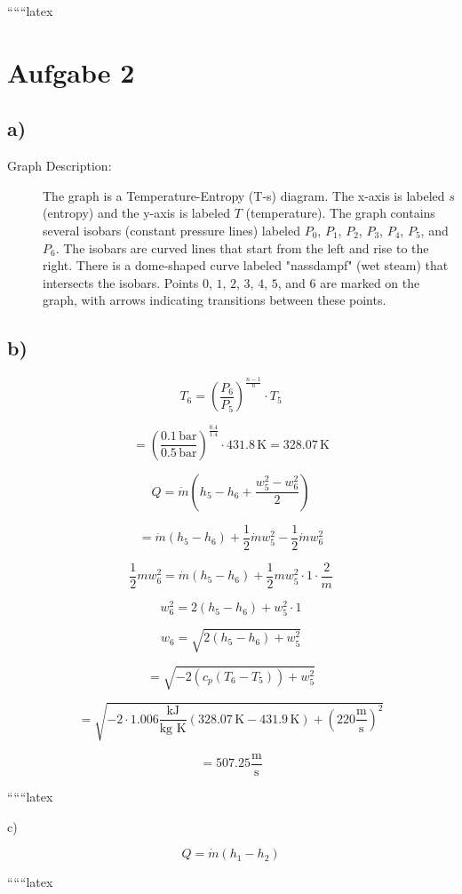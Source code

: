 
``````latex


\section*{Aufgabe 2}

\subsection*{a)}

\begin{description}
    \item[Graph Description:] The graph is a Temperature-Entropy (T-s) diagram. The x-axis is labeled $s$ (entropy) and the y-axis is labeled $T$ (temperature). The graph contains several isobars (constant pressure lines) labeled $P_0$, $P_1$, $P_2$, $P_3$, $P_4$, $P_5$, and $P_6$. The isobars are curved lines that start from the left and rise to the right. There is a dome-shaped curve labeled "nassdampf" (wet steam) that intersects the isobars. Points $0$, $1$, $2$, $3$, $4$, $5$, and $6$ are marked on the graph, with arrows indicating transitions between these points.
\end{description}

\subsection*{b)}

\[
T_6 = \left( \frac{P_6}{P_5} \right)^{\frac{n-1}{n}} \cdot T_5
\]

\[
= \left( \frac{0.1 \, \text{bar}}{0.5 \, \text{bar}} \right)^{\frac{0.4}{1.4}} \cdot 431.8 \, \text{K} = 328.07 \, \text{K}
\]

\[
Q = \dot{m} (h_5 - h_6 + \frac{w_5^2 - w_6^2}{2})
\]

\[
= \dot{m} (h_5 - h_6) + \frac{1}{2} \dot{m} w_5^2 - \frac{1}{2} \dot{m} w_6^2
\]

\[
\frac{1}{2} m w_6^2 = \dot{m} (h_5 - h_6) + \frac{1}{2} m w_5^2 \cdot 1 \cdot \frac{2}{m}
\]

\[
w_6^2 = 2 (h_5 - h_6) + w_5^2 \cdot 1
\]

\[
w_6 = \sqrt{2 (h_5 - h_6) + w_5^2}
\]

\[
= \sqrt{-2 (c_p (T_6 - T_5)) + w_5^2}
\]

\[
= \sqrt{-2 \cdot 1.006 \frac{\text{kJ}}{\text{kg K}} (328.07 \, \text{K} - 431.9 \, \text{K}) + (220 \frac{\text{m}}{\text{s}})^2}
\]

\[
= 507.25 \frac{\text{m}}{\text{s}}
\]

``````latex


c)

\[
Q = \dot{m} (h_1 - h_2)
\]

``````latex



